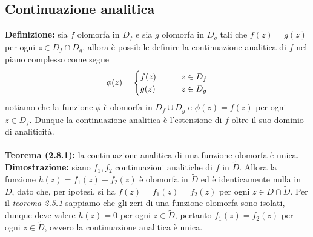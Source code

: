 \documentclass{article}
\begin{document}
\newpage
\subsection{Continuazione analitica}
\textbf{Definizione:} sia $f$ olomorfa in $D_f$ e sia $g$ olomorfa in $D_g$ tali che $f(z) = g(z)$ per ogni $z \in D_f \cap D_g$, allora è possibile definire la continuazione analitica di $f$ nel piano complesso come segue
\begin{gather}
    \phi(z) = \begin{cases}
        f(z) \qquad &z \in D_f \\
        g(z) \qquad &z \in D_g
    \end{cases} \notag
\end{gather}
notiamo che la funzione $\phi$ è olomorfa in $D_f \cup D_g$ e $\phi(z) = f(z)$ per ogni $z \in D_f$. Dunque la continuazione analitica è l'estensione di $f$ oltre il suo dominio di analiticità. \\ \\
\textbf{Teorema (2.8.1):} la continuazione analitica di una funzione olomorfa è unica. \\

\textbf{Dimostrazione:} siano $f_1, f_2$ continuazioni analitiche di $f$ in $\tilde{D}$. Allora la funzione $h(z) = f_1(z) - f_2(z)$ è olomorfa in $\tilde{D}$ ed è identicamente nulla in $D$, dato che, per ipotesi, si ha $f(z) = f_1(z) = f_2(z)$ per ogni $z \in D \cap \tilde{D}$. Per il \textit{teorema 2.5.1} sappiamo che gli zeri di una funzione olomorfa sono isolati, dunque deve valere $h(z) = 0$ per ogni $z \in \tilde{D}$, pertanto $f_1(z) = f_2(z)$ per ogni $z \in \tilde{D}$, ovvero la continuazione analitica è unica.
\end{document}
